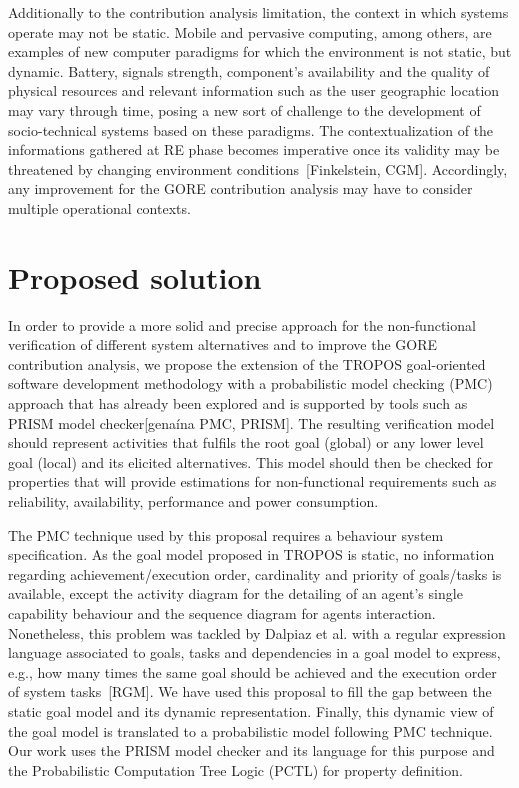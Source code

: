 Additionally to the contribution analysis limitation, the context in which systems operate may not be static. Mobile and pervasive computing, among others, are examples of new computer paradigms for which the environment is not static, but dynamic. Battery, signals strength, component's availability and the quality of physical resources and relevant information such as the user geographic location may vary through time, posing a new sort of challenge to the development of socio-technical systems based on these paradigms. The contextualization of the informations gathered at RE phase becomes imperative once its validity may be threatened by changing environment conditions~[Finkelstein, CGM]. Accordingly, any improvement for the GORE contribution analysis may have to consider multiple operational contexts.



\section{Proposed solution}

In order to provide a more solid and precise approach for the non-functional verification of different system alternatives and to improve the GORE contribution analysis, we propose the extension of the TROPOS goal-oriented software development methodology with a probabilistic model checking (PMC) approach that has already been explored and is supported by tools such as PRISM model checker[genaína PMC, PRISM]. The resulting verification model should represent activities that fulfils the root goal (global) or any lower level goal (local) and its elicited alternatives. This model should then be checked for properties that will provide estimations for non-functional requirements such as reliability, availability, performance and power consumption. 

The PMC technique used by this proposal requires a behaviour system specification. As the goal model proposed in TROPOS is static, no information regarding achievement/execution order, cardinality and priority of goals/tasks is available, except the activity diagram for the detailing of an agent's single capability behaviour and the sequence diagram for agents interaction. Nonetheless, this problem was tackled by Dalpiaz et al. with a regular expression language associated to goals, tasks and dependencies in a goal model to express, e.g., how many times the same goal should be achieved and the execution order of system tasks~[RGM]. We have used this proposal to fill the gap between the static goal model and its dynamic representation. Finally, this dynamic view of the goal model is translated to a probabilistic model following PMC technique. Our work uses the PRISM model checker and its language for this purpose and the Probabilistic Computation Tree Logic (PCTL) for property definition.

